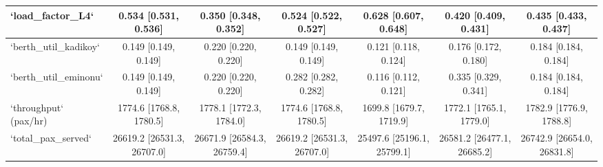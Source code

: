 \documentclass[11pt,a4paper]{article}
\begin{document}
\begin{table}[H]
{\begin{tabular}{lcccccc}
`load_factor_L4`         &  0.534 [0.531, 0.536] &  0.350 [0.348, 0.352] &  0.524 [0.522, 0.527] &  0.628 [0.607, 0.648] &  0.420 [0.409, 0.431] &  0.435 [0.433, 0.437] \\
\midrule
`berth_util_kadikoy`     &  0.149 [0.149, 0.149] &  0.220 [0.220, 0.220] &  0.149 [0.149, 0.149] &  0.121 [0.118, 0.124] &  0.176 [0.172, 0.180] &  0.184 [0.184, 0.184] \\
`berth_util_eminonu`     &  0.149 [0.149, 0.149] &  0.220 [0.220, 0.220] &  0.282 [0.282, 0.282] &  0.116 [0.112, 0.121] &  0.335 [0.329, 0.341] &  0.184 [0.184, 0.184] \\
\midrule
`throughput` (pax/hr)    & 1774.6 [1768.8, 1780.5] & 1778.1 [1772.3, 1784.0] & 1774.6 [1768.8, 1780.5] & 1699.8 [1679.7, 1719.9] & 1772.1 [1765.1, 1779.0] & 1782.9 [1776.9, 1788.8] \\
`total_pax_served`       & 26619.2 [26531.3, 26707.0] & 26671.9 [26584.3, 26759.4] & 26619.2 [26531.3, 26707.0] & 25497.6 [25196.1, 25799.1] & 26581.2 [26477.1, 26685.2] & 26742.9 [26654.0, 26831.8] \\
\bottomrule
\end{tabular}
}
\end{table}
\end{document}
